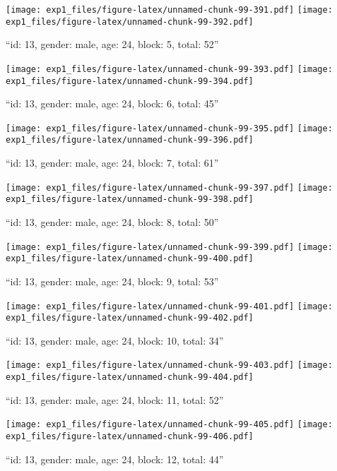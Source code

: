 \documentclass[,]{article}
\begin{document}
\texttt{[image: exp1\_files/figure-latex/unnamed-chunk-99-391.pdf]}
\texttt{[image: exp1\_files/figure-latex/unnamed-chunk-99-392.pdf]}

\newpage
[1] 

``id: 13, gender: male, age: 24, block: 5, total: 52''

\texttt{[image: exp1\_files/figure-latex/unnamed-chunk-99-393.pdf]}
\texttt{[image: exp1\_files/figure-latex/unnamed-chunk-99-394.pdf]}

\newpage
[1] 

``id: 13, gender: male, age: 24, block: 6, total: 45''

\texttt{[image: exp1\_files/figure-latex/unnamed-chunk-99-395.pdf]}
\texttt{[image: exp1\_files/figure-latex/unnamed-chunk-99-396.pdf]}

\newpage
[1] 

``id: 13, gender: male, age: 24, block: 7, total: 61''

\texttt{[image: exp1\_files/figure-latex/unnamed-chunk-99-397.pdf]}
\texttt{[image: exp1\_files/figure-latex/unnamed-chunk-99-398.pdf]}

\newpage
[1] 

``id: 13, gender: male, age: 24, block: 8, total: 50''

\texttt{[image: exp1\_files/figure-latex/unnamed-chunk-99-399.pdf]}
\texttt{[image: exp1\_files/figure-latex/unnamed-chunk-99-400.pdf]}

\newpage
[1] 

``id: 13, gender: male, age: 24, block: 9, total: 53''

\texttt{[image: exp1\_files/figure-latex/unnamed-chunk-99-401.pdf]}
\texttt{[image: exp1\_files/figure-latex/unnamed-chunk-99-402.pdf]}

\newpage
[1] 

``id: 13, gender: male, age: 24, block: 10, total: 34''

\texttt{[image: exp1\_files/figure-latex/unnamed-chunk-99-403.pdf]}
\texttt{[image: exp1\_files/figure-latex/unnamed-chunk-99-404.pdf]}

\newpage
[1] 

``id: 13, gender: male, age: 24, block: 11, total: 52''

\texttt{[image: exp1\_files/figure-latex/unnamed-chunk-99-405.pdf]}
\texttt{[image: exp1\_files/figure-latex/unnamed-chunk-99-406.pdf]}

\newpage
[1] 

``id: 13, gender: male, age: 24, block: 12, total: 44''
\end{document}
